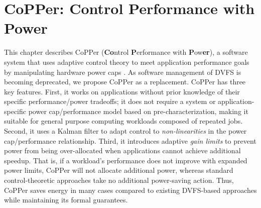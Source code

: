 \chapter{CoPPer: Control Performance with Power}
\label{sec:copper}

This chapter describes CoPPer (\textbf{Co}ntrol \textbf{P}erf\-ormance with \textbf{P}ow\textbf{er}), a software system that uses adaptive control theory to meet application performance goals by manipulating hardware power caps \cite{CopperTR}.
As software management of DVFS is becoming deprecated, we propose CoPPer as a replacement.
CoPPer has three key features.
First, it works on applications without prior knowledge of their specific performance/power tradeoffs; \ie it does not require a system or application-specific power cap/performance model based on pre-characterization, making it suitable for general purpose computing workloads composed of repeated jobs.
Second, it uses a Kalman filter to adapt control to \emph{non-linearities} in the power cap/performance relationship.
Third, it introduces adaptive \emph{gain limits} to prevent power from being over-allocated when applications cannot achieve additional speedup.
That is, if a workload's performance does not improve with expanded power limits, CoPPer will not allocate additional power, whereas standard control-theoretic approaches take no additional power-saving action.
Thus, CoPPer saves energy in many cases compared to existing DVFS-based approaches while maintaining its formal guarantees.






